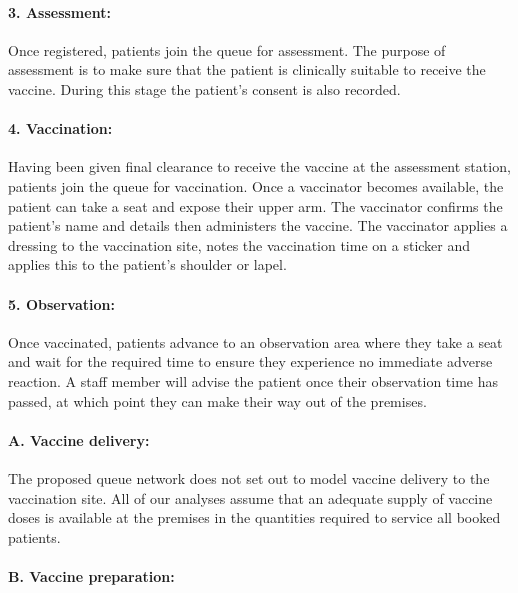 \documentclass{article}
\begin{document}
\hypertarget{assessment}{%
\paragraph{3. Assessment:}\label{assessment}}

Once registered, patients join the queue for assessment. The purpose of
assessment is to make sure that the patient is clinically suitable to
receive the vaccine. During this stage the patient's consent is also
recorded.

\hypertarget{vaccination}{%
\paragraph{4. Vaccination:}\label{vaccination}}

Having been given final clearance to receive the vaccine at the
assessment station, patients join the queue for vaccination. Once a
vaccinator becomes available, the patient can take a seat and expose
their upper arm. The vaccinator confirms the patient's name and details
then administers the vaccine. The vaccinator applies a dressing to the
vaccination site, notes the vaccination time on a sticker and applies
this to the patient's shoulder or lapel.

\hypertarget{observation}{%
\paragraph{5. Observation:}\label{observation}}

Once vaccinated, patients advance to an observation area where they take
a seat and wait for the required time to ensure they experience no
immediate adverse reaction. A staff member will advise the patient once
their observation time has passed, at which point they can make their
way out of the premises.

\hypertarget{a.-vaccine-delivery}{%
\paragraph{A. Vaccine delivery:}\label{a.-vaccine-delivery}}

The proposed queue network does not set out to model vaccine delivery to
the vaccination site. All of our analyses assume that an adequate supply
of vaccine doses is available at the premises in the quantities required
to service all booked patients.

\hypertarget{b.-vaccine-preparation}{%
\paragraph{B. Vaccine preparation:}\label{b.-vaccine-preparation}}
\end{document}
